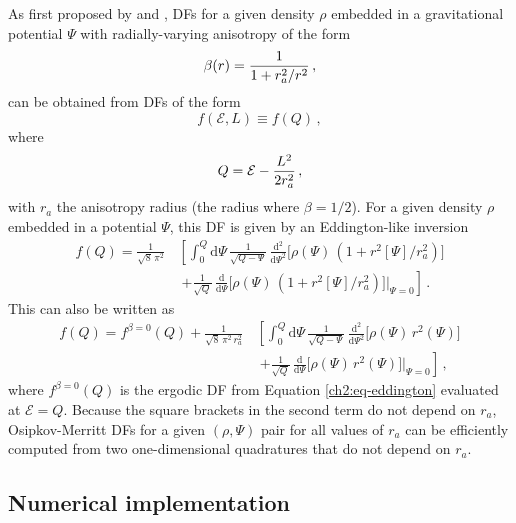 As first proposed by \textcite{osipkov79} and \textcite{merritt85}, DFs for a given density $\rho$ embedded in a gravitational potential $\Psi$ with radially-varying anisotropy of the form
\begin{equation}\label{ch2:eq-anidf-osipkov}
    \beta(r) = {1 \over 1+r_a^2/r^2}\,,
\end{equation}
can be obtained from DFs of the form
\begin{equation}
    f(\mathcal{E},L) \equiv f(Q)\,,
\end{equation}
where
\begin{equation}
    Q = \mathcal{E}-{L^2 \over 2r_a^2}\,,
\end{equation}
with $r_a$ the anisotropy radius (the radius where $\beta = 1/2$). For a given density $\rho$ embedded in a potential $\Psi$, this DF is given by an Eddington-like inversion
\begin{equation}
\begin{split}
    f(Q) =  \frac{1}{\sqrt{8}\,\pi^2}\,& \left[ \int_0^Q\mathrm{d}\Psi\,\frac{1}{\sqrt{Q-\Psi}}\,\frac{\mathrm{d}^2}{\mathrm{d}\Psi^2}\Big[\rho(\Psi)\,(1+r^2[\Psi]/r_a^2)\Big]\right.\\&  \ \left. +\frac{1}{\sqrt{Q}}\,\frac{\mathrm{d}}{\mathrm{d}\Psi}\Big[\rho(\Psi)\,(1+r^2[\Psi]/r_a^2)\Big]\Big|_{\Psi=0}\right]\,.
\end{split}
\end{equation}
This can also be written as
\begin{equation}\label{ch2:eq-spherdf-omdf}
\begin{split}
    f(Q) = f^{\beta=0}(Q)+\frac{1}{\sqrt{8}\,\pi^2\,r_a^2}\,&\left[\int_0^Q\mathrm{d}\Psi\,\frac{1}{\sqrt{Q-\Psi}}\,\frac{\mathrm{d}^2}{\mathrm{d}\Psi^2}\Big[\rho(\Psi)\,r^2(\Psi)\Big]\right.\\ & \ \left.+\frac{1}{\sqrt{Q}}\,\frac{\mathrm{d}}{\mathrm{d}\Psi}\Big[\rho(\Psi)\,r^2(\Psi)\Big]\Big|_{\Psi=0}\right]\,,
\end{split}
\end{equation}
where $f^{\beta=0}(Q)$ is the ergodic DF from Equation \eqref{ch2:eq-eddington} evaluated at $\mathcal{E} = Q$. Because the square brackets in the second term do not depend on $r_a$, Osipkov-Merritt DFs for a given $(\rho,\Psi)$ pair for all values of $r_a$ can be efficiently computed from two one-dimensional quadratures that do not depend on $r_a$.

\subsection{Numerical implementation}

